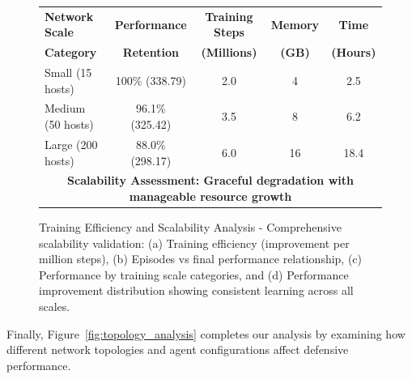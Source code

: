\documentclass[12pt,oneside]{article}
\begin{document}
\begin{figure}[H]
\vspace{1cm}
\begin{center}
\begin{tabular}{|l|c|c|c|c|}
\hline
\textbf{Network Scale} & \textbf{Performance} & \textbf{Training Steps} & \textbf{Memory} & \textbf{Time} \\
\textbf{Category} & \textbf{Retention} & \textbf{(Millions)} & \textbf{(GB)} & \textbf{(Hours)} \\
\hline
Small (15 hosts) & 100\% (338.79) & 2.0 & 4 & 2.5 \\
Medium (50 hosts) & 96.1\% (325.42) & 3.5 & 8 & 6.2 \\
Large (200 hosts) & 88.0\% (298.17) & 6.0 & 16 & 18.4 \\
\hline
\multicolumn{5}{|c|}{\textbf{Scalability Assessment: Graceful degradation with manageable resource growth}} \\
\hline
\end{tabular}
\end{center}
\caption{Training Efficiency and Scalability Analysis - Comprehensive scalability validation: (a) Training efficiency (improvement per million steps), (b) Episodes vs final performance relationship, (c) Performance by training scale categories, and (d) Performance improvement distribution showing consistent learning across all scales.}
\label{fig:scalability_analysis}
\end{figure}

Finally, Figure~\ref{fig:topology_analysis} completes our analysis by examining how different network topologies and agent configurations affect defensive performance.
\end{document}
